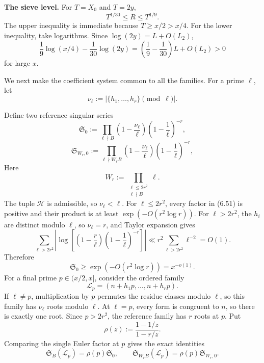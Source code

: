 \documentclass[10pt,letterpaper]{article}
\newcommand{\HH}{\mathcal{H}}
\newcommand{\LL}{\mathcal{L}}
\newcommand{\sing}{\mathfrak{S}}
\begin{document}
\textbf{The sieve level.} For $T=X_0$ and $T=2y$,
\[
T^{1/30}\le R\le T^{1/9}.
\]
The upper inequality is immediate because $T\ge x/2>x/4$. For the lower inequality, take logarithms. Since
$\log(2y)=L+O(L_2)$,
\[
\frac19\log(x/4)-\frac1{30}\log(2y)
=\left(\frac19-\frac1{30}\right)L+O(L_2)>0
\]
for large $x$.

We next make the coefficient system common to all the families. For a prime $\ell$, let
\[
\nu_\ell:=|\{h_1,\ldots,h_r\}\pmod\ell|.
\]

Define two reference singular series
\begin{equation}
\sing_0:=\prod_{\ell\nmid B}\left(1-\frac{\nu_\ell}\ell\right)\left(1-\frac1\ell\right)^{-r},
\tag{6.51}
\end{equation}
\begin{equation}
\sing_{W_r,0}:=\prod_{\ell\nmid W_rB}\left(1-\frac{\nu_\ell}\ell\right)\left(1-\frac1\ell\right)^{-r},
\tag{6.52}
\end{equation}
Here
\[
W_r:=\prod_{\substack{\ell\le2r^2\\\ell\nmid B}}\ell.
\]
The tuple $\HH$ is admissible, so $\nu_\ell<\ell$. For $\ell\le2r^2$, every factor in (6.51) is positive and their product is at
least $\exp(-O(r^2\log r))$. For $\ell>2r^2$, the $h_i$ are distinct modulo $\ell$, so $\nu_\ell=r$, and Taylor expansion gives
\[
\sum_{\ell>2r^2}\left|\log\left[\left(1-\frac r\ell\right)\left(1-\frac1\ell\right)^{-r}\right]\right|
\ll r^2\sum_{\ell>2r^2}\ell^{-2}=O(1).
\]
Therefore
\begin{equation}
\sing_0\ge\exp(-O(r^2\log r))=x^{-o(1)}.
\tag{6.53}
\end{equation}
For a final prime $p\in(x/2,x]$, consider the ordered family
\begin{equation}
\LL_p=(n+h_1p,\ldots,n+h_rp).
\tag{6.54}
\end{equation}
If $\ell\ne p$, multiplication by $p$ permutes the residue classes modulo $\ell$, so this family has $\nu_\ell$ roots modulo $\ell$. At
$\ell=p$, every form is congruent to $n$, so there is exactly one root. Since $p>2r^2$, the reference family has $r$ roots
at $p$. Put
\begin{equation}
\rho(z):=\frac{1-1/z}{1-r/z}.
\tag{6.55}
\end{equation}
Comparing the single Euler factor at $p$ gives the exact identities
\begin{equation}
\sing_B(\LL_p)=\rho(p)\sing_0,\qquad
\sing_{W_rB}(\LL_p)=\rho(p)\sing_{W_r,0}.
\tag{6.56}
\end{equation}
\end{document}
